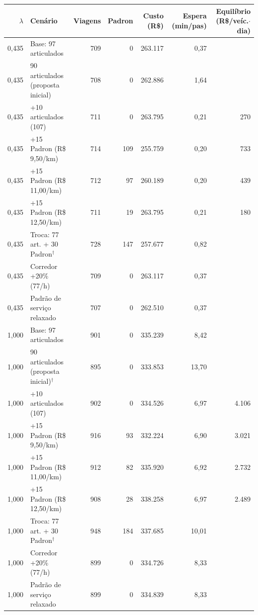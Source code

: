 \begin{tabular}{rlrrrrr}
\toprule
$\lambda$ & Cenário & Viagens & Padron & Custo (R\$) & Espera (min/pas) & Equilíbrio (R\$/veíc.$\cdot$dia) \\
\midrule
0{,}435 & Base: 97 articulados & 709 & 0 & 263.117 & 0{,}37 &  \\
0{,}435 & 90 articulados (proposta inicial) & 708 & 0 & 262.886 & 1{,}64 &  \\
0{,}435 & +10 articulados (107) & 711 & 0 & 263.795 & 0{,}21 & 270 \\
0{,}435 & +15 Padron (R\$ 9,50/km) & 714 & 109 & 255.759 & 0{,}20 & 733 \\
0{,}435 & +15 Padron (R\$ 11,00/km) & 712 & 97 & 260.189 & 0{,}20 & 439 \\
0{,}435 & +15 Padron (R\$ 12,50/km) & 711 & 19 & 263.795 & 0{,}21 & 180 \\
0{,}435 & Troca: 77 art. + 30 Padron$^\dagger$ & 728 & 147 & 257.677 & 0{,}82 &  \\
0{,}435 & Corredor +20\% (77/h) & 709 & 0 & 263.117 & 0{,}37 &  \\
0{,}435 & Padrão de serviço relaxado & 707 & 0 & 262.510 & 0{,}37 &  \\
\midrule
1{,}000 & Base: 97 articulados & 901 & 0 & 335.239 & 8{,}42 &  \\
1{,}000 & 90 articulados (proposta inicial)$^\dagger$ & 895 & 0 & 333.853 & 13{,}70 &  \\
1{,}000 & +10 articulados (107) & 902 & 0 & 334.526 & 6{,}97 & 4.106 \\
1{,}000 & +15 Padron (R\$ 9,50/km) & 916 & 93 & 332.224 & 6{,}90 & 3.021 \\
1{,}000 & +15 Padron (R\$ 11,00/km) & 912 & 82 & 335.920 & 6{,}92 & 2.732 \\
1{,}000 & +15 Padron (R\$ 12,50/km) & 908 & 28 & 338.258 & 6{,}97 & 2.489 \\
1{,}000 & Troca: 77 art. + 30 Padron$^\dagger$ & 948 & 184 & 337.685 & 10{,}01 &  \\
1{,}000 & Corredor +20\% (77/h) & 899 & 0 & 334.726 & 8{,}33 &  \\
1{,}000 & Padrão de serviço relaxado & 899 & 0 & 334.839 & 8{,}33 &  \\
\bottomrule
\end{tabular}
